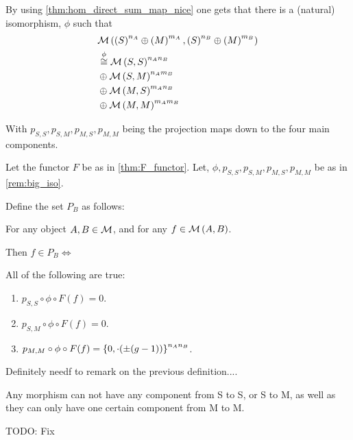 \begin{remark} \label{rem:big_iso}
    By using \autoref{thm:hom_direct_sum_map_nice} one gets that there is a (natural) isomorphism, \( \phi \) such that
    \begin{align*}
        &{\mathcal{M}}\left( \left(  S  \right)^{n_A} \oplus \left(  M  \right)^{m_A}, \left(  S  \right)^{n_B} \oplus \left(  M  \right)^{m_B} \right) \\
        &\stackrel{\phi}{\cong} {\mathcal{M}}\left(  S, S  \right)^{n_An_B} \\
        &\oplus {\mathcal{M}}\left(  S, M  \right)^{n_Am_B} \\
        &\oplus {\mathcal{M}}\left(  M, S  \right)^{m_An_B} \\
        &\oplus {\mathcal{M}}\left(  M, M  \right)^{m_Am_B}
    \end{align*}

    With \( p_{S, S}, p_{S, M}, p_{M, S}, p_{M, M} \) being the projection maps down to the four main components.
\end{remark}

\begin{definition} %
    Let the functor \( F \) be as in \autoref{thm:F_functor}.  Let, \( \phi, p_{S, S}, p_{S, M}, p_{M, S}, p_{M, M} \) be as in \autoref{rem:big_iso}.

    Define the set \( P_B \) as follows:

    For any object \( A, B \in {\mathcal{M}} \), and for any \( f \in {\mathcal{M}}\left( A, B \right) \).

    Then \( f \in P_B \iff \)

    All of the following are true:
    \begin{enumerate}
        \item {
            \( p_{S, S} \circ \phi \circ F(f) = 0 \).
        }
        \item {
            \( p_{S, M} \circ \phi \circ F(f) = 0 \).
        }
        \item {
            \( p_{M, M} \circ \phi \circ F(f) = \left\{ 0, \cdot(\pm (g - 1)) \right\}^{n_An_B} \).
        }
    \end{enumerate}
\end{definition}

\begin{remark}
    Definitely needf to remark on the previous definition.... 
    
    Any morphism can not have any component from S to S, or S to M, as well as they can only have one certain component from M to M.

    TODO: Fix
\end{remark}

